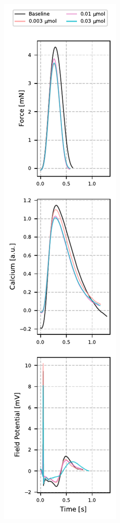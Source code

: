 \documentclass{report}
\begin{document}
            \begin{figure}[h]
                \centering
                \begin{subfigure}[b]{0.3\textwidth}
                    \includegraphics[width=\textwidth, height=0.92\textheight]{plots/chapter_3/average_signals_e4031.pdf}

\end{subfigure}
\end{figure}
\end{document}
